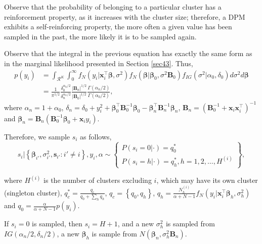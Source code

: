 Observe that the probability of belonging to a particular cluster has a reinforcement property, as it increases with the cluster size; therefore, a DPM exhibits a self-reinforcing property, the more often a given value has been sampled in the past, the more likely it is to be sampled again.

Observe that the integral in the previous equation has exactly the same form as in the marginal likelihood presented in Section \ref{sec43}. Thus,
\begin{align*}
	p(y_i)&=\int_{\mathcal{R}^K}\int_{0}^{\infty}f_N(y_i|\boldsymbol{x}_i^{\top}\boldsymbol{\beta},\sigma^2)f_N\left(\boldsymbol\beta\Big|\boldsymbol\beta_0,\sigma^2\boldsymbol B_0\right)f_{IG}(\sigma^2|\alpha_0,\delta_0)d\sigma^2 d\boldsymbol\beta\\
	&=\frac{1}{\pi^{1/2}}\frac{\delta_0^{\alpha_0/2}}{\delta_n^{\alpha_n/2}}\frac{|{\boldsymbol{B}}_n|^{1/2}}{|{\boldsymbol{B}}_0|^{1/2}}\frac{\Gamma(\alpha_n/2)}{\Gamma(\alpha_0/2)}, 
\end{align*}
where $\alpha_n=1+\alpha_0$, $\delta_n=\delta_0 + y_i^2 + \boldsymbol{\beta}_0^{\top}{\boldsymbol{B}}_0^{-1}\boldsymbol{\beta}_0 - \boldsymbol{\beta}_n^{\top}{\boldsymbol{B}}_n^{-1}\boldsymbol{\beta}_n$,  $\boldsymbol{B}_n = (\boldsymbol{B}_0^{-1} + \boldsymbol{x}_i\boldsymbol{x}_i^{\top})^{-1}$ and $\boldsymbol{\beta}_n = \boldsymbol{B}_n(\boldsymbol{B}_0^{-1}\boldsymbol{\beta}_0 + \boldsymbol{x}_iy_i)$.

Therefore, we sample $s_i$ as follows,
\begin{equation*}
	s_i|\left\{\boldsymbol\beta_{i'},\sigma_{i'}^2,\boldsymbol s_{i'}:i'\neq i\right\}, y_i, \alpha\sim\begin{Bmatrix}P(s_i=0|\cdot)=q_0^*\\
		P(s_i=h|\cdot)=q_h^*, h=1,2,\dots,H^{(i)}\end{Bmatrix},
\end{equation*}

where $H^{(i)}$ is the number of clusters excluding $i$, which may have its own cluster (singleton cluster), $q^*_c=\frac{q_c}{q_0+\sum_h q_h}$, $q_c=\left\{q_0,q_h\right\}$, $q_h=\frac{N_h^{(i)}}{\alpha+N-1}f_N(y_i|\boldsymbol{x}_i^{\top}\boldsymbol\beta_h,\sigma_h^2)$ and $q_0=\frac{\alpha}{\alpha+N-1}p(y_i)$.

If $s_i=0$ is sampled, then $s_i=H+1$, and a new $\sigma_h^2$ is sampled from $IG\left(\alpha_n/2,\delta_n/2\right)$, a new $\boldsymbol\beta_h$ is sample from $N(\boldsymbol\beta_n,\sigma_h^2\boldsymbol B_n)$.

